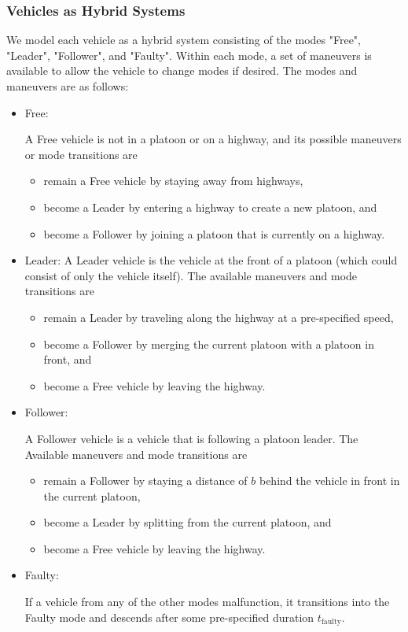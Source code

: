 \subsubsection{Vehicles as Hybrid Systems}
We model each vehicle as a hybrid system \cite{Lygeros98,Lygeros12} consisting of the modes "Free", "Leader", "Follower", and "Faulty". Within each mode, a set of maneuvers is available to allow the vehicle to change modes if desired. The modes and maneuvers are as follows:

\begin{itemize}
\item Free: 

A Free vehicle is not in a platoon or on a highway, and its possible maneuvers or mode transitions are
\begin{itemize}
\item remain a Free vehicle by staying away from highways,
\item become a Leader by entering a highway to create a new platoon, and
\item become a Follower by joining a platoon that is currently on a highway.
\end{itemize} 

\item Leader: 
A Leader vehicle is the vehicle at the front of a platoon (which could consist of only the vehicle itself). The available maneuvers and mode transitions are

\begin{itemize}
\item remain a Leader by traveling along the highway at a pre-specified speed,
\item become a Follower by merging the current platoon with a platoon in front, and
\item become a Free vehicle by leaving the highway.
\end{itemize}

\item Follower: 

A Follower vehicle is a vehicle that is following a platoon leader. The Available maneuvers and mode transitions are 

\begin{itemize}
\item remain a Follower by staying a distance of $b$ behind the vehicle in front in the current platoon,
\item become a Leader by splitting from the current platoon, and
\item become a Free vehicle by leaving the highway.
\end{itemize}

\item Faulty: 

If a vehicle from any of the other modes malfunction, it transitions into the Faulty mode and descends after some pre-specified duration $t_\text{faulty}$.
\end{itemize}


